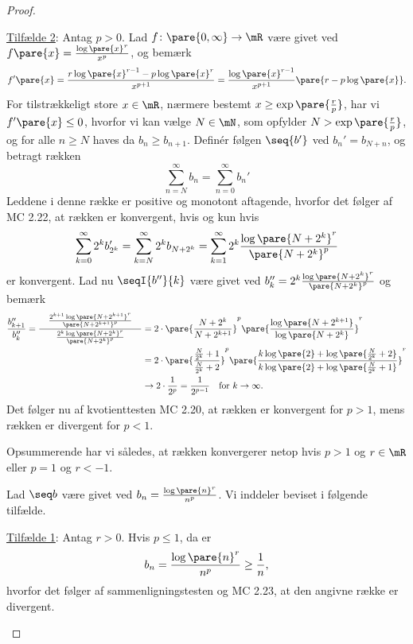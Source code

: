 \begin{opg}
\begin{enumerate}
\begin{proof}
\begin{indent}
    \underline{Tilfælde 2}: Antag $p>0$. Lad $f\colon\pare{0,\infty}\to\mR$ være givet ved $f\pare{x}=\frac{\log\pare{x}^r}{x^p}$, og bemærk
    $$ f'\pare{x} = \frac{r\log\pare{x}^{r-1} - p\log\pare{x}^r}{x^{p+1}}
        = \frac{\log\pare{x}^{r-1}}{x^{p+1}}\pare{r-p\log\pare{x}}. $$
    For tilstrækkeligt store $x\in\mR$, nærmere bestemt $x \geq \exp\pare{\frac{r}{p}}$, har vi $f'\pare{x}\leq 0$, hvorfor vi kan vælge $N\in\mN$, som opfylder $N > \exp\pare{\frac{r}{p}}$, og for alle $n\geq N$ haves da $b_n \geq b_{n+1}$. Definér følgen $\seq{b'}$ ved $b_n' = b_{N+n}$, og betragt rækken
    $$ \sum_{n=N}^\infty b_n = \sum_{n=0}^\infty b_n' $$
    Leddene i denne række er positive og monotont aftagende, hvorfor det følger af MC 2.22, at rækken er konvergent, hvis og kun hvis
    $$ \sum_{k=0}^\infty 2^kb_{2^k}'
        = \sum_{k=N}^\infty 2^kb_{N+2^k}
        = \sum_{k=1}^\infty 2^k\frac{\log\pare{N+2^k}^r}{\pare{N+2^k}^p} $$
    er konvergent. Lad nu $\seqI{b''}{k}$ være givet ved $b_k''=2^k\frac{\log\pare{N+2^k}^r}{\pare{N+2^k}^p}$ og bemærk
    \begin{align*}
        \frac{b_{k+1}''}{b_k''}
        = \frac{\quad\frac{2^{k+1}\log\pare{N+2^{k+1}}^r}
            {\pare{N+2^{k+1}}^p}\quad}
            {\frac{2^k\log\pare{N+2^k}^r}{\pare{N+2^k}^p}}
        &= 2\cdot \pare{\frac{N+2^k}{N+2^{k+1}}}^p \pare{\frac{\log\pare{N+2^{k+1}}}{\log\pare{N+2^k}}}^r \\
        &= 2\cdot \pare{\frac{\frac{N}{2^k} + 1}{\frac{N}{2^k}+2}}^p
            \pare{\frac{k\log\pare{2} + \log\pare{\frac{N}{2^{k}} + 2}}
            {k\log\pare{2} + \log\pare{\frac{N}{2^{k}} + 1}}}^r \\
        &\to 2\cdot \frac{1}{2^p} = \frac{1}{2^{p-1}} \quad \text{for } k\to\infty.
    \end{align*}
    Det følger nu af kvotienttesten MC 2.20, at rækken er konvergent for $p>1$, mens rækken er divergent for $p < 1$.
    \end{indent}
    Opsummerende har vi således, at rækken konvergerer netop hvis $p>1$ og $r\in\mR$ eller $p = 1$ og $r<-1$.
    
    Lad $\seq b$ være givet ved $b_n = \frac{\log\pare{n}^r}{n^p}$. Vi inddeler beviset i følgende tilfælde.
    
    \begin{indent}
    \underline{Tilfælde 1}: Antag $r> 0$. Hvis $p\leq 1$, da er
    $$ b_n = \frac{\log\pare{n}^r}{n^p} \geq \frac{1}{n}, $$
    hvorfor det følger af sammenligningstesten og MC 2.23, at den angivne række er divergent.
    

\end{indent}
\end{proof}
\end{enumerate}
\end{opg}
